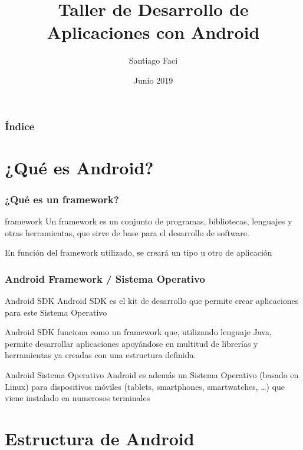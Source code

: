\documentclass[xcolor={dvipsnames}]{beamer}
\begin{document}
\title{Taller de Desarrollo de Aplicaciones con Android}  
\author{Santiago Faci}
\date{Junio 2019} 

\begin{frame}
\titlepage
\end{frame}

\begin{frame}[plain]\frametitle{Índice}\tableofcontents
\end{frame} 


\section{¿Qué es Android?} 
\begin{frame}\frametitle{¿Qué es un framework?} 
    \begin{block}{framework}
    Un framework es un conjunto de programas, bibliotecas, lenguajes y otras herramientas, que sirve de base para el desarrollo de software.
    \end{block}
    \begin{block}{}
    En función del framework utilizado, se creará un tipo u otro de aplicación
    \end{block}
\end{frame}

\begin{frame}\frametitle{Android Framework / Sistema Operativo}
    \begin{block}{Android SDK}
    Android SDK es el kit de desarrollo que permite crear aplicaciones para este Sistema Operativo

    Android SDK funciona como un framework que, utilizando lenguaje Java, permite desarrollar aplicaciones apoyándose en multitud de librerías y
    herramientas ya creadas con una estructura definida.
    \end{block}
    \pause \begin{block}{Android Sistema Operativo}
    Android es además un Sistema Operativo (basado en Linux) para dispositivos móviles (tablets, smartphones, smartwatches, \ldots) que viene
    instalado en numerosos terminales
    \end{block}
\end{frame}

\section{Estructura de Android} 
\end{document}
